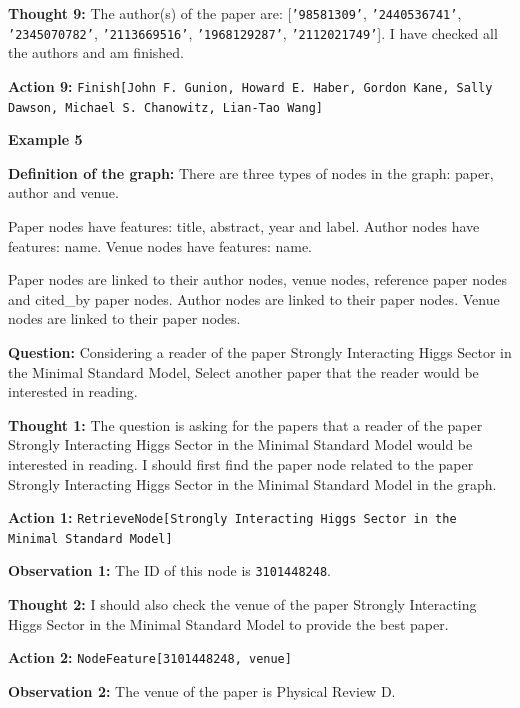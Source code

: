 \textbf{Thought 9:} The author(s) of the paper are: [\texttt{'98581309'}, \texttt{'2440536741'}, \texttt{'2345070782'}, \texttt{'2113669516'}, \texttt{'1968129287'}, \texttt{'2112021749'}]. I have checked all the authors and am finished. \par
\textbf{Action 9:} \texttt{Finish[John F. Gunion, Howard E. Haber, Gordon Kane, Sally Dawson, Michael S. Chanowitz, Lian-Tao Wang]} \par

\bigskip

\textbf{Example 5} \par
\medskip

\textbf{Definition of the graph:}
There are three types of nodes in the graph: paper, author and venue. \par
Paper nodes have features: title, abstract, year and label. Author nodes have features: name. Venue nodes have features: name. \par
Paper nodes are linked to their author nodes, venue nodes, reference paper nodes and cited\_by paper nodes. Author nodes are linked to their paper nodes. Venue nodes are linked to their paper nodes. \par

\textbf{Question:}
Considering a reader of the paper Strongly Interacting Higgs Sector in the Minimal Standard Model, Select another paper that the reader would be interested in reading. \par

\textbf{Thought 1:} The question is asking for the papers that a reader of the paper Strongly Interacting Higgs Sector in the Minimal Standard Model would be interested in reading. I should first find the paper node related to the paper Strongly Interacting Higgs Sector in the Minimal Standard Model in the graph. \par
\textbf{Action 1:} \texttt{RetrieveNode[Strongly Interacting Higgs Sector in the Minimal Standard Model]} \par
\textbf{Observation 1:} The ID of this node is \texttt{3101448248}. \par

\textbf{Thought 2:} I should also check the venue of the paper Strongly Interacting Higgs Sector in the Minimal Standard Model to provide the best paper. \par
\textbf{Action 2:} \texttt{NodeFeature[3101448248, venue]} \par
\textbf{Observation 2:} The venue of the paper is Physical Review D. \par

